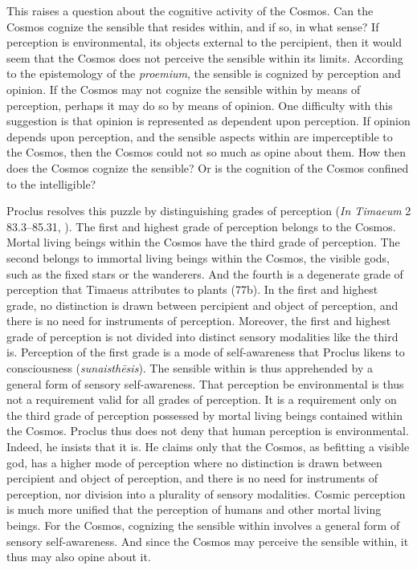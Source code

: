 This raises a question about the cognitive activity of the Cosmos. Can the Cosmos cognize the sensible that resides within, and if so, in what sense? If perception is environmental, its objects external to the percipient, then it would seem that the Cosmos does not perceive the sensible within its limits. According to the epistemology of the \emph{proemium}, the sensible is cognized by perception and opinion. If the Cosmos may not cognize the sensible within by means of perception, perhaps it may do so by means of opinion. One difficulty with this suggestion is that opinion is represented as dependent upon perception. If opinion depends upon perception, and the sensible aspects within are imperceptible to the Cosmos, then the Cosmos could not so much as opine about them. How then does the Cosmos cognize the sensible? Or is the cognition of the Cosmos confined to the intelligible?

Proclus resolves this puzzle by distinguishing grades of perception (\emph{In Timaeum} 2 83.3--85.31, \citealt{Diehl:1903re}). The first and highest grade of perception belongs to the Cosmos. Mortal living beings within the Cosmos have the third grade of perception. The second belongs to immortal living beings within the Cosmos, the visible gods, such as the fixed stars or the wanderers. And the fourth is a degenerate grade of perception that Timaeus attributes to plants (77b). In the first and highest grade, no distinction is drawn between percipient and object of perception, and there is no need for instruments of perception. Moreover, the first and highest grade of perception is not divided into distinct sensory modalities like the third is. Perception of the first grade is a mode of self-awareness that Proclus likens to consciousness (\emph{sunaisthēsis}). The sensible within is thus apprehended by a general form of sensory self-awareness. That perception be environmental is thus not a requirement valid for all grades of perception. It is a requirement only on the third grade of perception possessed by mortal living beings contained within the Cosmos. Proclus thus does not deny that human perception is environmental. Indeed, he insists that it is. He claims only that the Cosmos, as befitting a visible god, has a higher mode of perception where no distinction is drawn between percipient and object of perception, and there is no need for instruments of perception, nor division into a plurality of sensory modalities. Cosmic perception is much more unified that the perception of humans and other mortal living beings. For the Cosmos, cognizing the sensible within involves a general form of sensory self-awareness. And since the Cosmos may perceive the sensible within, it thus may also opine about it. 

